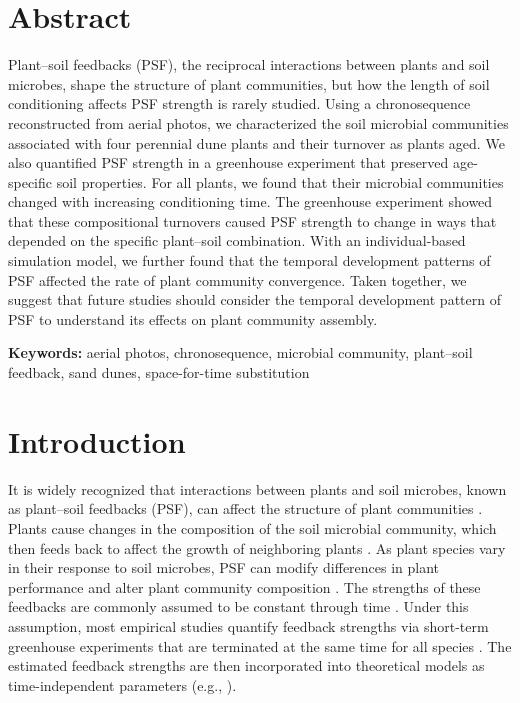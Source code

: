 \section{Abstract}
Plant--soil feedbacks (PSF), the reciprocal interactions between plants and soil microbes, shape the structure of plant communities, but how the length of soil conditioning affects PSF strength is rarely studied. 
Using a chronosequence reconstructed from aerial photos, we characterized the soil microbial communities associated with four perennial dune plants and their turnover as plants aged. 
We also quantified PSF strength in a greenhouse experiment that preserved age-specific soil properties.
For all plants, we found that their microbial communities changed with increasing conditioning time.
The greenhouse experiment showed that these compositional turnovers caused PSF strength to change in ways that depended on the specific plant--soil combination. 
With an individual-based simulation model, we further found that the temporal development patterns of PSF affected the rate of plant community convergence. 
Taken together, we suggest that future studies should consider the temporal development pattern of PSF to understand its effects on plant community assembly.
\medskip


\textbf{Keywords:} aerial photos, chronosequence, microbial community, plant--soil feedback, sand dunes, space-for-time substitution



\section{Introduction}
It is widely recognized that interactions between plants and soil microbes, known as plant--soil feedbacks (PSF), can affect the structure of plant communities \citep{Bever2010, vanderPutten2013, KeMiki2015}. 
Plants cause changes in the composition of the soil microbial community, which then feeds back to affect the growth of neighboring plants \citep{Bever1997, Bever2003}. As plant species vary in their response to soil microbes, PSF can modify differences in plant performance and alter plant community composition \citep{Klironomos2002, Mangan2010, Eppinga2018}.
The strengths of these feedbacks are commonly assumed to be constant through time \citep{Kardol2013}. Under this assumption, most empirical studies quantify feedback strengths via short-term greenhouse experiments that are terminated at the same time for all species \citep{KulmatiskiKardol2008, Kardol2013}. The estimated feedback strengths are then incorporated into theoretical models as time-independent parameters (e.g., \citealp{Fukami2013, Bauer2015, Teste2017}). 
\par


